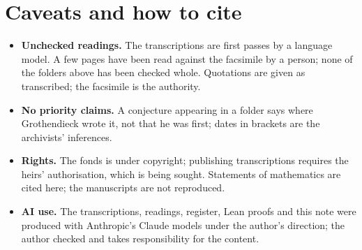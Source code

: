 \documentclass[11pt,a4paper]{article}
\begin{document}
\section{Caveats and how to cite}\label{sec:caveats}
\begin{itemize}
\item \textbf{Unchecked readings.} The transcriptions are first passes by a
  language model. A few pages have been read against the facsimile by a
  person; none of the folders above has been checked whole. Quotations are
  given as transcribed; the facsimile is the authority.
\item \textbf{No priority claims.} A conjecture appearing in a folder says
  where Grothendieck wrote it, not that he was first; dates in brackets are
  the archivists' inferences.
\item \textbf{Rights.} The fonds is under copyright; publishing transcriptions
  requires the heirs' authorisation, which is being sought. Statements of
  mathematics are cited here; the manuscripts are not reproduced.
\item \textbf{AI use.} The transcriptions, readings, register, Lean proofs and
  this note were produced with Anthropic's Claude models under the author's
  direction; the author checked and takes responsibility for the content.
\end{itemize}
\end{document}
